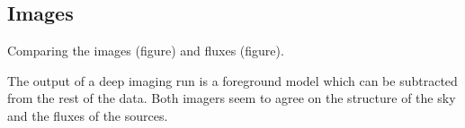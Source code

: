 \subsection{Images}
Comparing the images (figure) and fluxes (figure). 

The output of a deep imaging run is a foreground model which can be subtracted from the rest of the data. Both imagers seem to agree on the structure of the sky and the fluxes of the sources.

